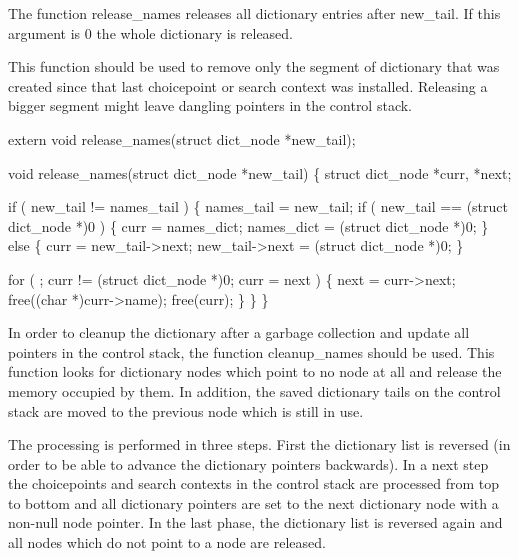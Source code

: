 \nwendcode{}\nwdocspar
The function {\Tt{}release{\_}names\nwendquote} releases all dictionary entries after
{\Tt{}new{\_}tail\nwendquote}. If this argument is {\Tt{}0\nwendquote} the whole dictionary is
released.

This function should be used to remove only the segment of dictionary
that was created since that last choicepoint or search context was
installed. Releasing a bigger segment might leave dangling pointers in
the control stack.

\nwenddocs{}\plusendmoddef\nwstartdeflinemarkup{}\nwenddeflinemarkup
extern void release_names(struct dict_node *new_tail);

\nwendcode{}\nwdocspar
\nwenddocs{}\plusendmoddef\nwstartdeflinemarkup{}\nwenddeflinemarkup
void
release_names(struct dict_node *new_tail)
\{
    struct dict_node *curr, *next;

    if ( new_tail != names_tail )
    \{
        names_tail = new_tail;
        if ( new_tail == (struct dict_node *)0 )
        \{
            curr       = names_dict;
            names_dict = (struct dict_node *)0;
        \}
        else
        \{
            curr           = new_tail->next;
            new_tail->next = (struct dict_node *)0;
        \}

        for ( ; curr != (struct dict_node *)0; curr = next )
        \{
            next = curr->next;
            free((char *)curr->name);
            free(curr);
        \}
    \}
\}

\nwendcode{}\nwdocspar
In order to cleanup the dictionary after a garbage collection and
update all pointers in the control stack, the function
{\Tt{}cleanup{\_}names\nwendquote} should be used. This function looks for dictionary
nodes which point to no node at all and release the memory occupied by
them. In addition, the saved dictionary tails on the control stack
are moved to the previous node which is still in use.

The processing is performed in three steps. First the dictionary list
is reversed (in order to be able to advance the dictionary pointers
backwards). In a next step the choicepoints and search contexts in the
control stack are processed from top to bottom and all dictionary
pointers are set to the next dictionary node with a non-null node
pointer. In the last phase, the dictionary list is reversed again and
all nodes which do not point to a node are released.

